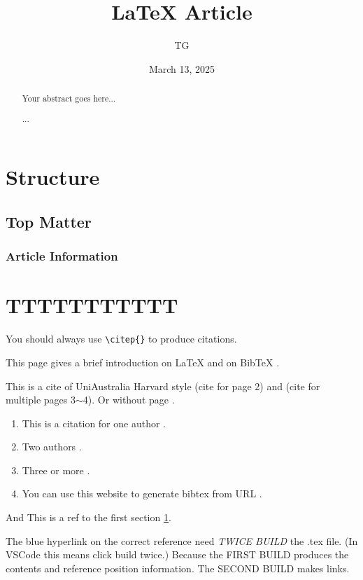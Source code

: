 \documentclass[a4paper]{article}
\title{LaTeX Article}
\author{TG}
\date{March 13, 2025}
\begin{document}
\maketitle

\begin{abstract}
    Your abstract goes here...

    ...
\end{abstract}

{\hypersetup{hidelinks} \tableofcontents} %

\section{Structure}
\label{sec:structure}  %

\lipsum[1-2]

\subsection{Top Matter}

\lipsum[3-4]

\subsubsection{Article Information}

\lipsum[5-6]

\section{TTTTTTTTTTT}

You should always use \verb|\citep{}| to produce citations.

This page gives a brief introduction on LaTeX \citep{wikibooksLaTeXDocStruct} and on BibTeX \citep{overleafBibTeX}.

This is a cite of UniAustralia Harvard style \citep[p.~2]{vaswani2017attention} (cite for page 2) and \citep[pp.~3-4]{vaswani2017attention} (cite for multiple pages 3$\sim$4). Or without page \citep{vaswani2017attention}.

\begin{enumerate}
    \item This is a citation for one author \citep{ticker2017music}.
    \item Two authors \citep{habel2009academic}.
    \item Three or more \citep{mnih2015human}.
    \item You can use this website to generate bibtex from URL \citep{getbibtexBibTeXGenerator}.
\end{enumerate}

And This is a ref to the first section \ref{sec:structure}. 

The blue hyperlink on the correct reference need \emph{TWICE BUILD} the .tex file. (In VSCode this means click build twice.) Because the FIRST BUILD produces the contents and reference position information. The SECOND BUILD makes links.


\end{document}
